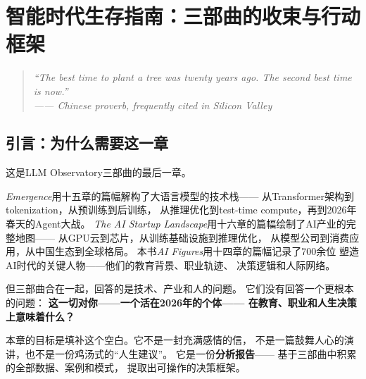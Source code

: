 
\chapter{智能时代生存指南：三部曲的收束与行动框架}
\label{ch:field-guide}


\begin{quote}
\itshape
``The best time to plant a tree was twenty years ago.
The second best time is now.''\\
\upshape\footnotesize
—— Chinese proverb, frequently cited in Silicon Valley
\end{quote}

\bigskip


\section{引言：为什么需要这一章}
\label{sec:fg-intro}

这是LLM Observatory三部曲的最后一章。

\textit{Emergence}用十五章的篇幅解构了大语言模型的技术栈——
从Transformer架构到tokenization，从预训练到后训练，
从推理优化到test-time compute，再到2026年春天的Agent大战。
\textit{The AI Startup Landscape}用十六章的篇幅绘制了AI产业的完整地图——
从GPU云到芯片，从训练基础设施到推理优化，
从模型公司到消费应用，从中国生态到全球格局。
本书\textit{AI Figures}用十四章的篇幅记录了700余位
塑造AI时代的关键人物——他们的教育背景、职业轨迹、
决策逻辑和人际网络。

但三部曲合在一起，回答的是技术、产业和人的问题。
它们没有回答一个更根本的问题：
\textbf{这一切对你——一个活在2026年的个体——
在教育、职业和人生决策上意味着什么？}

本章的目标是填补这个空白。它不是一封充满感情的信，
不是一篇鼓舞人心的演讲，也不是一份鸡汤式的``人生建议''。
它是一份\textbf{分析报告}——
基于三部曲中积累的全部数据、案例和模式，
提取出可操作的决策框架。

